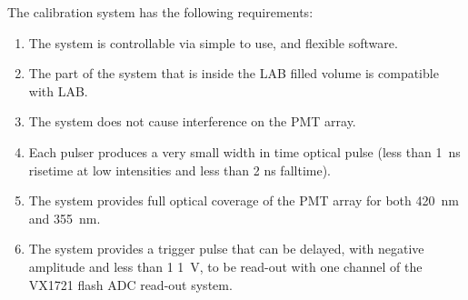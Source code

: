 

The calibration system has the following requirements:

\begin{enumerate}
\item The system is controllable via simple to use, and flexible software. 
\item The part of the system that is inside the LAB filled volume is compatible with LAB.
\item The system does not cause interference on the PMT array.
\item Each pulser produces a very small width in time optical pulse (less than 1~ns risetime at low intensities and less than 2 ns falltime).
\item The system provides full optical coverage of the PMT array for both 420~nm and 355~nm. 
\item The system provides a trigger pulse that can be delayed, with negative amplitude and less than 1 1~V, to be read-out with one channel of the VX1721 flash ADC read-out system.
\end{enumerate}